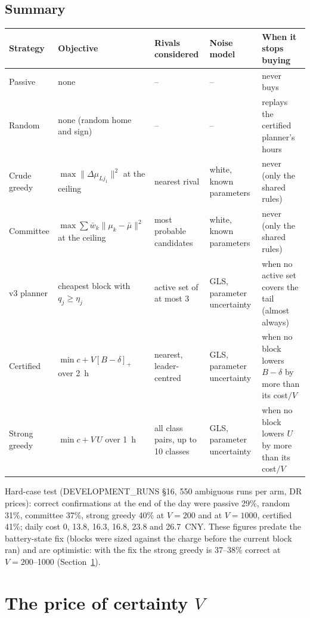\documentclass[11pt]{article}
\theoremstyle{definition}
\begin{document}
{\subsection{Summary}
\begin{center}
\small
\begin{tabularx}{\textwidth}{@{}l>{\raggedright\arraybackslash}X>{\raggedright\arraybackslash}X>{\raggedright\arraybackslash}X>{\raggedright\arraybackslash}X@{}}
\toprule
Strategy & Objective & Rivals considered & Noise model & When it stops buying\\
\midrule
Passive & none & -- & -- & never buys\\
Random & none (random home and sign) & -- & -- & replays the certified planner's hours\\
Crude greedy & $\max\|\Delta\mu_{Lj_1}\|^2$ at the ceiling & nearest rival & white, known parameters & never (only the shared rules)\\
Committee & $\max\sum\bar w_k\|\mu_k-\bar\mu\|^2$ at the ceiling & 8 most probable candidates & white, known parameters & never (only the shared rules)\\
v3 planner & cheapest block with $q_j\ge\eta_j$ & active set of at most 3 & GLS, parameter uncertainty & when no active set covers the tail (almost always)\\
Certified & $\min c+V[B-\delta]_+$ over 2~h & 20 nearest, leader-centred & GLS, parameter uncertainty & when no block lowers $B-\delta$ by more than its cost$/V$\\
Strong greedy & $\min c+V\,U$ over 1~h & all class pairs, up to 10 classes & GLS, parameter uncertainty & when no block lowers $U$ by more than its cost$/V$\\
\bottomrule
\end{tabularx}
\end{center}

\noindent Hard-case test (DEVELOPMENT\_RUNS \S16, 550 ambiguous runs per arm, DR prices): correct confirmations at the end of the day were passive 29\%, random 31\%, committee 37\%, strong greedy 40\% at $V=200$ and at $V=1000$, certified 41\%; daily cost 0, 13.8, 16.3, 16.8, 23.8 and 26.7~CNY. These figures predate the battery-state fix (blocks were sized against the charge before the current block ran) and are optimistic: with the fix the strong greedy is 37--38\% correct at $V=200$--1000 (Section~\ref{sec:V}).

\section{The price of certainty \texorpdfstring{$V$}{V}}\label{sec:V}

}
\end{document}
